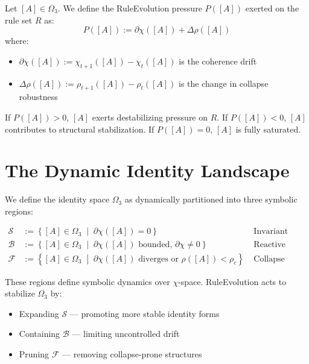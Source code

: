 \begin{definition} \label{def:ruleevolution-pressure}
Let $[A] \in \Omega_3$.  
We define the RuleEvolution pressure $P([A])$ exerted on the rule set $R$ as:
\begin{equation} \label{eq:ruleevolution-pressure}
P([A]) := \partial \chi([A]) + \Delta \rho([A])
\end{equation}
where:
\begin{itemize}
  \item $\partial \chi([A]) := \chi_{t+1}([A]) - \chi_t([A])$ is the coherence drift
  \item $\Delta \rho([A]) := \rho_{t+1}([A]) - \rho_t([A])$ is the change in collapse robustness
\end{itemize}
\end{definition}

If $P([A]) > 0$, $[A]$ exerts destabilizing pressure on $R$.  
If $P([A]) < 0$, $[A]$ contributes to structural stabilization.  
If $P([A]) = 0$, $[A]$ is fully saturated.

\section{The Dynamic Identity Landscape} \label{the-dynamic-identity-landscape}

We define the identity space $\Omega_3$ as dynamically partitioned into three symbolic regions:

\begin{align*}
\mathcal{S} &:= \left\{ [A] \in \Omega_3 \;\middle|\; \partial \chi([A]) = 0 \right\} && \text{Invariant Surface} \\
\mathcal{B} &:= \left\{ [A] \in \Omega_3 \;\middle|\; \partial \chi([A]) \text{ bounded, } \partial \chi \ne 0 \right\} && \text{Reactive Basin} \\
\mathcal{F} &:= \left\{ [A] \in \Omega_3 \;\middle|\; \partial \chi([A]) \text{ diverges or } \rho([A]) < \rho_c \right\} && \text{Collapse Fringe}
\end{align*}

These regions define symbolic dynamics over $\chi$-space.  
RuleEvolution acts to stabilize $\Omega_3$ by:

\begin{itemize}
  \item Expanding $\mathcal{S}$ — promoting more stable identity forms
  \item Containing $\mathcal{B}$ — limiting uncontrolled drift
  \item Pruning $\mathcal{F}$ — removing collapse-prone structures
\end{itemize}


